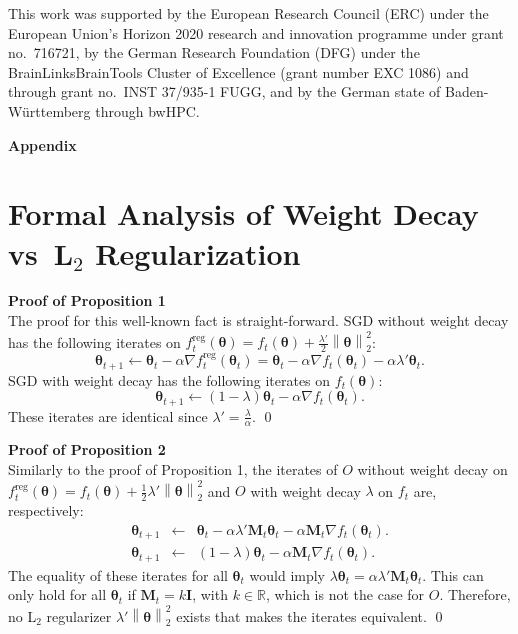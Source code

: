 \documentclass[usenames,dvipsnames]{article}
\newcommand{\norm}[1]{\left\lVert#1\right\rVert}
\begin{document}
This work was supported by the European Research Council (ERC) under the European Union's Horizon 2020 research and innovation programme under grant no.\ 716721, by the German Research Foundation (DFG) under the BrainLinksBrainTools Cluster of Excellence (grant number EXC 1086) and through grant no.\ INST 37/935-1 FUGG, and by the German state of Baden-W\"{u}rttemberg through bwHPC. 




\cleardoublepage
\setcounter{page}{1}

\appendix
{\begin{center}\Large{\textbf{Appendix}}\end{center}}
\section{Formal Analysis of Weight Decay vs\ L$_2$ Regularization}
\label{sec:decay_vs_L_2}

\noindent{}\textbf{Proof of Proposition 1}\\
The proof for this well-known fact is straight-forward.
SGD without weight decay has the following iterates on $f_{t}^{\text{reg}}(\bm{\theta}) = f_t(\bm{\theta}) + \frac{\lambda'}{2} \norm{\bm{\theta}}_2^2$: 
\begin{equation}
\label{eq:sgdl2}
\bm{\theta}_{t+1} \leftarrow \bm{\theta}_t - \alpha \nabla f_{t}^{\text{reg}}(\bm{\theta}_t) = \bm{\theta}_t - \alpha \nabla f_t(\bm{\theta}_t) - \alpha  \lambda' \bm{\theta}_t.
\end{equation}
SGD with weight decay has the following iterates on $f_t(\bm{\theta})$: 
\begin{equation}
\label{eq:sgdwd}
\bm{\theta}_{t+1} \leftarrow (1 - \lambda) \bm{\theta}_t - \alpha \nabla f_t(\bm{\theta}_t).
\end{equation}
These iterates are identical since $\lambda' = \frac{\lambda}{\alpha}$. \qed

\noindent{}\textbf{Proof of Proposition 2}\\
Similarly to the proof of Proposition 1, the iterates of $O$ without weight decay on $f^{\text{reg}}_t(\bm{\theta}) = f_t(\bm{\theta}) + \frac{1}{2}  \lambda' \norm{\bm{\theta}}_2^2$ and $O$ with weight decay $\lambda$ on $f_t$ are, respectively:
\begin{eqnarray}
\label{eq:adgrl2}
\bm{\theta}_{t+1} &\leftarrow& \bm{\theta}_t - \alpha  \lambda' \mathbf{M}_t \bm{\theta}_t - \alpha \mathbf{M}_t \nabla f_t(\bm{\theta}_t).\\
\label{eq:adgr_wd}
\bm{\theta}_{t+1} &\leftarrow& (1 - \lambda) \bm{\theta}_t - \alpha \mathbf{M}_t \nabla f_t(\bm{\theta}_t).
\end{eqnarray}
The equality of these iterates for all $\bm{\theta}_t$ would imply
$\lambda\bm{\theta}_t = \alpha  \lambda' \mathbf{M}_t\bm{\theta}_t$.
This can only hold for all $\bm{\theta}_t$ if $\mathbf{M}_t = k \mathbf{I}$, with $k\in\mathbb{R}$, which is not the case for $O$. Therefore, no L$_2$ regularizer $\lambda' \norm{\bm{\theta}}_2^2$ exists that makes the iterates equivalent.
\qed
\end{document}
